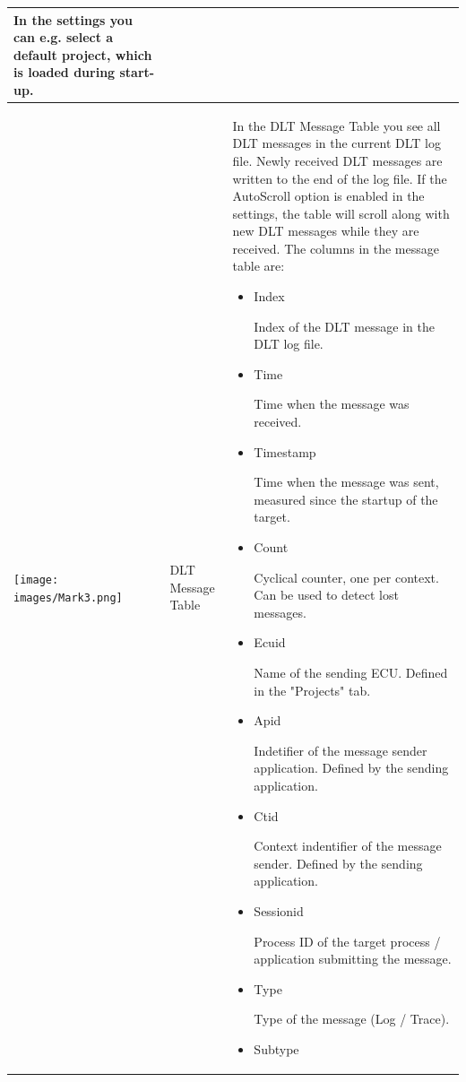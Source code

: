 \documentclass[a4paper,11pt]{article}
\begin{document}
\begin{longtable}{| l | m{3cm}  | m{11cm} |}
   In the settings you can e.g. select a default project, which is loaded during start-up.  \\
   \hline
   \texttt{[image: images/Mark3.png]}
   &
    DLT Message Table
   &
   In the DLT Message Table you see all DLT messages in the current DLT log file.
   Newly received DLT messages are written to the end of the log file.
   If the AutoScroll option is enabled in the settings, the table will scroll along with new DLT messages while they are received.
   The columns in the message table are:\label{messagetablecolumns}
  \begin{itemize}
   \item \begin{bf}Index\end{bf}
    Index of the DLT message in the DLT log file.
   \item \begin{bf}Time\end{bf}
    Time when the message was received.
   \item \begin{bf}Timestamp\end{bf}
     Time when the message was sent, measured since the startup of the target.
   \item \begin{bf}Count\end{bf}
    Cyclical counter, one per context. Can be used to detect lost messages.
   \item \begin{bf}Ecuid\end{bf}
    Name of the sending ECU. Defined in the "Projects" tab.
   \item \begin{bf}Apid\end{bf}
    Indetifier of the message sender application. Defined by the sending application.
   \item \begin{bf}Ctid\end{bf}
    Context indentifier of the message sender. Defined by the sending application.
   \item \begin{bf}Sessionid\end{bf}
    Process ID of the target process / application submitting the message.
   \item \begin{bf}Type\end{bf}
    Type of the message (Log / Trace).
   \item \begin{bf}Subtype\end{bf}

\end{itemize}
\end{longtable}
\end{document}
